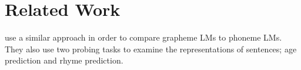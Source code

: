\section{Related Work}

\citet{bunzeck-etal-2025-small} use a similar approach in order to compare grapheme LMs to phoneme LMs. They also use two probing tasks to examine the representations of sentences; age prediction and rhyme prediction.
